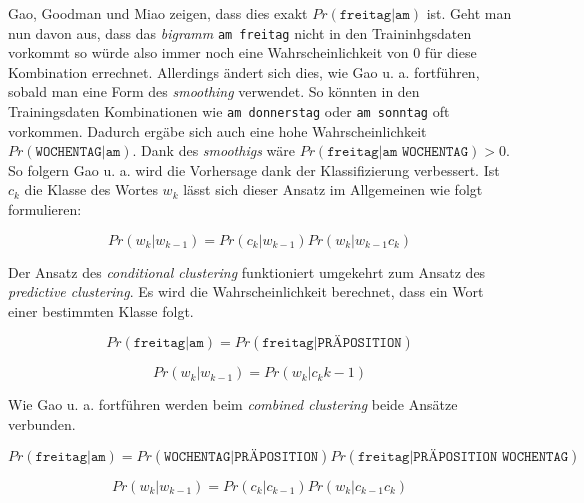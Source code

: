     Gao, Goodman und Miao zeigen, dass dies exakt \(Pr(\texttt{freitag}|\texttt{am})\) ist. Geht man nun davon aus, dass das \emph{bigramm} \texttt{am freitag} nicht in den Traininhgsdaten vorkommt so würde also immer noch eine Wahrscheinlichkeit von 0 für diese Kombination errechnet. Allerdings ändert sich dies, wie Gao u. a. fortführen, sobald man eine Form des \emph{smoothing} verwendet. So könnten in den Trainingsdaten Kombinationen wie \texttt{am donnerstag} oder \texttt{am sonntag} oft vorkommen. Dadurch ergäbe sich auch eine hohe Wahrscheinlichkeit \(Pr(\texttt{WOCHENTAG}|\texttt{am})\). Dank des \emph{smoothigs} wäre \(Pr(\texttt{freitag}|\texttt{am WOCHENTAG}) > 0\). So folgern Gao u. a. wird die Vorhersage dank der Klassifizierung verbessert. Ist \(c_k\) die Klasse des Wortes \(w_k\) lässt sich dieser Ansatz im Allgemeinen wie folgt formulieren:
    
    \begin{equation}
   		Pr(w_k|w_{k-1}) = Pr(c_k|w_{k-1}) Pr(w_k|w_{k-1}c_k)
        \label{eq:predictive-clustering-math}
	\end{equation}
    
    
    Der Ansatz des \emph{conditional clustering} funktioniert  umgekehrt zum Ansatz des \emph{predictive clustering}. Es wird die Wahrscheinlichkeit berechnet, dass ein Wort einer bestimmten Klasse folgt.
    
    \begin{equation}
   		Pr(\texttt{freitag}|\texttt{am}) = Pr(\texttt{freitag}|\texttt{PRÄPOSITION})
        \label{eq:conditional-clustering-words}
	\end{equation}
    
    \begin{equation}
   		Pr(w_k|w_{k-1}) = Pr(w_k|c_k{k-1})
        \label{eq:conditional-clustering-math}
	\end{equation}
    
    Wie Gao u. a. fortführen werden beim \emph{combined clustering} beide Ansätze verbunden.
    
    \begin{equation}
   		Pr(\texttt{freitag}|\texttt{am}) = Pr(\texttt{WOCHENTAG}|\texttt{PRÄPOSITION}) Pr(\texttt{freitag}|\texttt{PRÄPOSITION WOCHENTAG})
        \label{eq:combined-clustering-words}
	\end{equation}
    
    \begin{equation}
   		Pr(w_k|w_{k-1}) = Pr(c_k|c_{k-1}) Pr(w_k|c_{k-1} c_k)
        \label{eq:combined-clustering-math}
	\end{equation}
    
